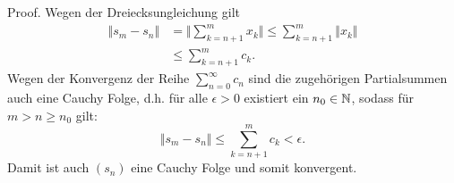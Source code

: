 \begin{emphBox}{}{}
Proof.  Wegen der Dreiecksungleichung gilt
\begin{align*}
\Vert s_m - s_n \Vert &= \Vert \sum_{k=n+1}^m x_k \Vert  \leq \sum_{k=n+1}^m  \Vert x_k \Vert \\
&\leq \sum_{k=n+1}^m c_k.\end{align*}
Wegen der Konvergenz der Reihe \(\sum_{n=0}^\infty c_n\) sind die zugehörigen Partialsummen auch eine Cauchy Folge, d.h. für alle \(\epsilon > 0\) existiert ein \(n_0 \in \mathbb{N}\), sodass für \(m > n \geq n_0\) gilt:
\begin{equation*}
 \Vert s_m - s_n \Vert \leq \sum_{k=n+1}^m c_k < \epsilon.
\end{equation*}
Damit ist auch \((s_n)\) eine Cauchy Folge und somit konvergent.
\end{emphBox}

